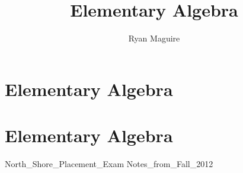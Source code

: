 \documentclass[crop=false,class=book,oneside]{standalone}
\begin{document}
    \newif\ifmathcourseselementaryalgebra
    \ifx\ifmathcourses\undefined
        \title{Elementary Algebra}
        \author{Ryan Maguire}
        \date{\vspace{-5ex}}
        \maketitle
        \tableofcontents
        \chapter*{Elementary Algebra}
        \setcounter{chapter}{1}
    \else
        \chapter{Elementary Algebra}
    \fi
    {North_Shore_Placement_Exam}
    {Notes_from_Fall_2012}

    \ifx\ifmathcourses\undefined
        \clearpage
        \printglossary[type=\acronymtype]
        \clearpage
        \printglossary[style=long]
    \fi
\end{document}

